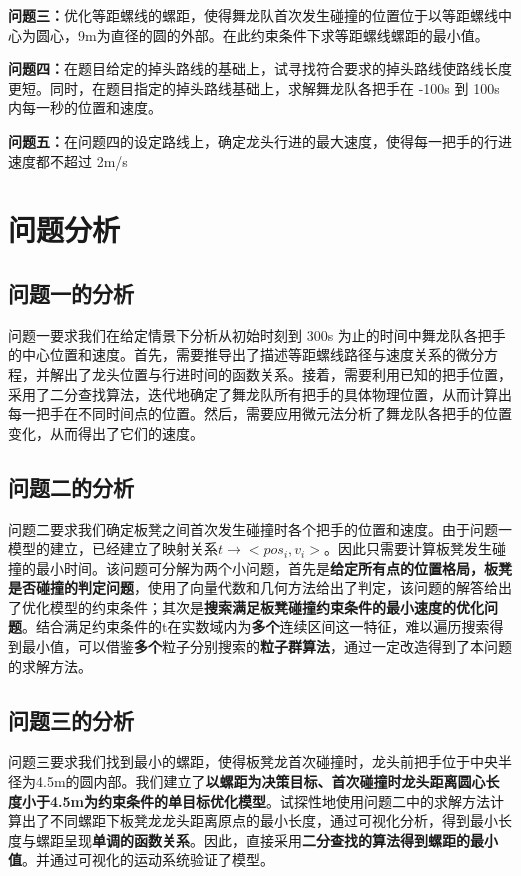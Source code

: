 \documentclass[a4paper]{article}
\begin{document}
		\textbf{问题三：}优化等距螺线的螺距，使得舞龙队首次发生碰撞的位置位于以等距螺线中心为圆心，9m为直径的圆的外部。在此约束条件下求等距螺线螺距的最小值。

		\textbf{问题四：}在题目给定的掉头路线的基础上，试寻找符合要求的掉头路线使路线长度更短。同时，在题目指定的掉头路线基础上，求解舞龙队各把手在 -100s 到 100s 内每一秒的位置和速度。

		\textbf{问题五：}在问题四的设定路线上，确定龙头行进的最大速度，使得每一把手的行进速度都不超过 2m/s

	\section{问题分析}
	\subsection{问题一的分析}
		问题一要求我们在给定情景下分析从初始时刻到 300s 为止的时间中舞龙队各把手的中心位置和速度。首先，需要推导出了描述等距螺线路径与速度关系的微分方程，并解出了龙头位置与行进时间的函数关系。接着，需要利用已知的把手位置，采用了二分查找算法，迭代地确定了舞龙队所有把手的具体物理位置，从而计算出每一把手在不同时间点的位置。然后，需要应用微元法分析了舞龙队各把手的位置变化，从而得出了它们的速度。
	\subsection{问题二的分析}
        问题二要求我们确定板凳之间首次发生碰撞时各个把手的位置和速度。由于问题一模型的建立，已经建立了映射关系$t\to<pos_i,v_i>$。因此只需要计算板凳发生碰撞的最小时间。该问题可分解为两个小问题，首先是\textbf{给定所有点的位置格局，板凳是否碰撞的判定问题}，使用了向量代数和几何方法给出了判定，该问题的解答给出了优化模型的约束条件；其次是\textbf{搜索满足板凳碰撞约束条件的最小速度的优化问题}。结合满足约束条件的t在实数域内为\textbf{多个}连续区间这一特征，难以遍历搜索得到最小值，可以借鉴\textbf{多个}粒子分别搜索的\textbf{粒子群算法}，通过一定改造得到了本问题的求解方法。
	\subsection{问题三的分析}
        问题三要求我们找到最小的螺距，使得板凳龙首次碰撞时，龙头前把手位于中央半径为4.5m的圆内部。我们建立了\textbf{以螺距为决策目标、首次碰撞时龙头距离圆心长度小于4.5m为约束条件的单目标优化模型}。试探性地使用问题二中的求解方法计算出了不同螺距下板凳龙龙头距离原点的最小长度，通过可视化分析，得到最小长度与螺距呈现\textbf{单调的函数关系}。因此，直接采用\textbf{二分查找的算法得到螺距的最小值}。并通过可视化的运动系统验证了模型。
\end{document}
